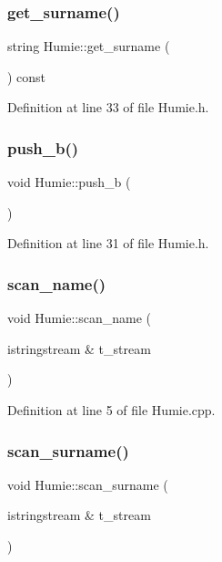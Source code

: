 \subsubsection{\texorpdfstring{get\_surname()}{get\_surname()}}
{\footnotesize\ttfamily string Humie\+::get\+\_\+surname (\begin{DoxyParamCaption}{ }\end{DoxyParamCaption}) const\hspace{0.3cm}{\ttfamily [inline]}}



Definition at line 33 of file Humie.\+h.

\mbox{\label{class_humie_aa6368dac76b40953826412687225f90b}} 
\subsubsection{\texorpdfstring{push\_b()}{push\_b()}}
{\footnotesize\ttfamily void Humie\+::push\+\_\+b (\begin{DoxyParamCaption}{ }\end{DoxyParamCaption})\hspace{0.3cm}{\ttfamily [inline]}}



Definition at line 31 of file Humie.\+h.

\mbox{\label{class_humie_a5552bf054c13cafd3e921b7de259b2d9}} 
\subsubsection{\texorpdfstring{scan\_name()}{scan\_name()}}
{\footnotesize\ttfamily void Humie\+::scan\+\_\+name (\begin{DoxyParamCaption}\item[{istringstream \&}]{t\+\_\+stream }\end{DoxyParamCaption})}



Definition at line 5 of file Humie.\+cpp.

\mbox{\label{class_humie_a98ca5452603ec476e06c6e73fd4007bb}} 
\subsubsection{\texorpdfstring{scan\_surname()}{scan\_surname()}}
{\footnotesize\ttfamily void Humie\+::scan\+\_\+surname (\begin{DoxyParamCaption}\item[{istringstream \&}]{t\+\_\+stream }\end{DoxyParamCaption})}



